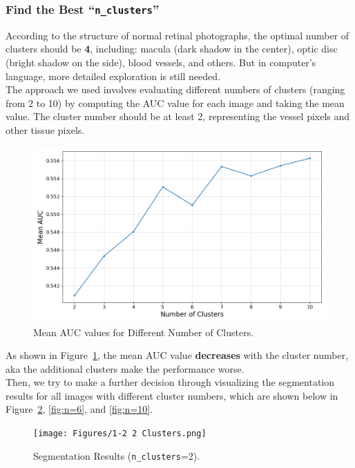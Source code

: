 \documentclass[12pt,letterpaper]{article}
\begin{document}
\subsubsection{Find the Best ``\texttt{n\_clusters}''}
According to the structure of normal retinal photographs, the optimal number of clusters should be \textbf{4}, including: macula (dark shadow in the center), optic disc (bright shadow on the side), blood vessels, and others. But in computer's language, more detailed exploration is still needed. \\
The approach we used involves evaluating different numbers of clusters (ranging from 2 to 10) by computing the AUC value for each image and taking the mean value. The cluster number should be at least 2, representing the vessel pixels and other tissue pixels. 
\begin{figure}[H]
    \centering
    \includegraphics[scale=0.5]{Figures/1-1 Find the Best n_clusters.png}
    \caption{Mean AUC values for Different Number of Clusters.}
    \label{fig:nclusters}
\end{figure}
\noindent
As shown in Figure~\ref{fig:nclusters}, the mean AUC value \textbf{decreases} with the cluster number, aka the additional clusters make the performance worse. \\
Then, we try to make a further decision through visualizing the segmentation results for all images with different cluster numbers, which are shown below in Figure~\ref{fig:n=2}, \ref{fig:n=6}, and \ref{fig:n=10}. 
\begin{figure}[H]
    \centering
    \texttt{[image: Figures/1-2 2 Clusters.png]}
    \vspace{-0.25cm}
    \caption{Segmentation Results (\texttt{n\_clusters}=2).}
    \label{fig:n=2}
\end{figure}
\end{document}
